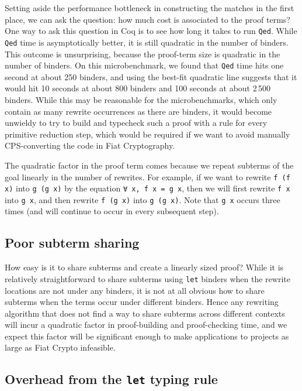 \documentclass[a4paper,USenglish,cleveref,autoref,thm-restate]{lipics-v2021}
\begin{document}
Setting aside the performance bottleneck in constructing the matches in the first place, we can ask the question: how much cost is associated to the proof terms?
One way to ask this question in Coq is to see how long it takes to run \texttt{Qed}.
While \texttt{Qed} time is asymptotically better, it is still quadratic in the number of binders.
This outcome is unsurprising, because the proof-term size is quadratic in the number of binders.
On this microbenchmark, we found that \texttt{Qed} time hits one second at about 250 binders, and using the best-fit quadratic line suggests that it would hit 10 seconds at about 800 binders and 100 seconds at about 2\,500 binders.
While this may be reasonable for the microbenchmarks, which only contain as many rewrite occurrences as there are binders, it would become unwieldy to try to build and typecheck such a proof with a rule for every primitive reduction step, which would be required if we want to avoid manually CPS-converting the code in Fiat Cryptography.

The quadratic factor in the proof term comes because we repeat subterms of the goal linearly in the number of rewrites.
For example, if we want to rewrite \texttt{f (f x)} into \texttt{g (g x)} by the equation \texttt{∀ x, f x = g x}, then we will first rewrite \texttt{f x} into \texttt{g x}, and then rewrite \texttt{f (g x)} into \texttt{g (g x)}.
Note that \texttt{g x} occurs three times (and will continue to occur in every subsequent step).

\subsection{Poor subterm sharing}

How easy is it to share subterms and create a linearly sized proof?
While it is relatively straightforward to share subterms using \texttt{let} binders when the rewrite locations are not under any binders, it is not at all obvious how to share subterms when the terms occur under different binders.
Hence any rewriting algorithm that does not find a way to share subterms across different contexts will incur a quadratic factor in proof-building and proof-checking time, and we expect this factor will be significant enough to make applications to projects as large as Fiat Crypto infeasible.

\subsection{Overhead from the \texttt{let} typing rule}
\end{document}
